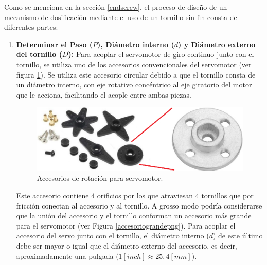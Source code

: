 Como se menciona en la sección \ref{endscrew}, el proceso de diseño de un mecanismo de dosificación mediante el uso de un tornillo sin fin consta de diferentes partes:

\begin{enumerate}[(1)]
    \item \textbf{Determinar el Paso ($P$), Diámetro interno ($d$) y Diámetro externo del tornillo ($D$): } Para acoplar el servomotor de giro continuo junto con el tornillo, se utiliza uno de los accesorios convencionales del servomotor (ver figura \ref{accesorioservopng}). Se utiliza este accesorio circular debido a que el tornillo consta de un diámetro interno, con eje rotativo concéntrico al eje giratorio del motor que le acciona, facilitando el acople entre ambas piezas.
    
    \begin{figure}[H]
	\begin{center}
		\includegraphics[scale=0.45]{img/accesorioservo.png}
	\end{center}
	\caption{Accesorios de rotación para servomotor. \label{accesorioservopng}}
    \end{figure}
    
    Este accesorio contiene 4 orificios por los que atraviesan 4 tornillos que por fricción conectan al accesorio y al tornillo. A grosso modo podría considerarse que la unión del accesorio y el tornillo conforman un accesorio más grande para el servomotor (ver Figura \ref{accesoriograndepng}).
    Para acoplar el accesorio del servo junto con el tornillo, el diámetro interno ($d$) de este último debe ser mayor o igual que el diámetro  externo del accesorio, es decir, aproximadamente una pulgada ($ 1 [inch] \approx 25,4 [mm]$).
    

\end{enumerate}
